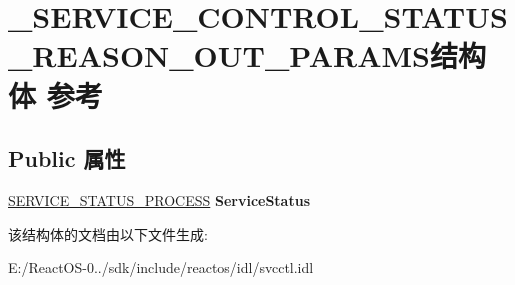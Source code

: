 \hypertarget{struct___s_e_r_v_i_c_e___c_o_n_t_r_o_l___s_t_a_t_u_s___r_e_a_s_o_n___o_u_t___p_a_r_a_m_s}{}\section{\+\_\+\+S\+E\+R\+V\+I\+C\+E\+\_\+\+C\+O\+N\+T\+R\+O\+L\+\_\+\+S\+T\+A\+T\+U\+S\+\_\+\+R\+E\+A\+S\+O\+N\+\_\+\+O\+U\+T\+\_\+\+P\+A\+R\+A\+M\+S结构体 参考}
\label{struct___s_e_r_v_i_c_e___c_o_n_t_r_o_l___s_t_a_t_u_s___r_e_a_s_o_n___o_u_t___p_a_r_a_m_s}
\subsection*{Public 属性}
\begin{DoxyCompactItemize}
\item 
\mbox{\label{struct___s_e_r_v_i_c_e___c_o_n_t_r_o_l___s_t_a_t_u_s___r_e_a_s_o_n___o_u_t___p_a_r_a_m_s_a888f9b39431464255c5addac1fdae593}} 
\hyperlink{struct___s_e_r_v_i_c_e___s_t_a_t_u_s___p_r_o_c_e_s_s}{S\+E\+R\+V\+I\+C\+E\+\_\+\+S\+T\+A\+T\+U\+S\+\_\+\+P\+R\+O\+C\+E\+SS} {\bfseries Service\+Status}
\end{DoxyCompactItemize}


该结构体的文档由以下文件生成\+:\begin{DoxyCompactItemize}
\item 
E\+:/\+React\+O\+S-\/0../sdk/include/reactos/idl/svcctl.\+idl\end{DoxyCompactItemize}
